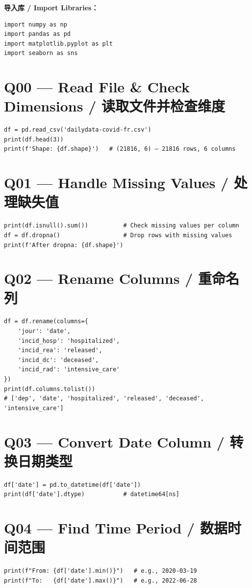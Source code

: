 \documentclass[11pt,a4paper]{report}
\begin{document}
\noindent\textbf{导入库 / Import Libraries：}
\begin{lstlisting}
import numpy as np
import pandas as pd
import matplotlib.pyplot as plt
import seaborn as sns
\end{lstlisting}

\section*{Q00 — Read File \& Check Dimensions / 读取文件并检查维度}
\begin{lstlisting}
df = pd.read_csv('dailydata-covid-fr.csv')
print(df.head(3))
print(f'Shape: {df.shape}')   # (21816, 6) — 21816 rows, 6 columns
\end{lstlisting}

\section*{Q01 — Handle Missing Values / 处理缺失值}
\begin{lstlisting}
print(df.isnull().sum())          # Check missing values per column
df = df.dropna()                  # Drop rows with missing values
print(f'After dropna: {df.shape}')
\end{lstlisting}

\section*{Q02 — Rename Columns / 重命名列}
\begin{lstlisting}
df = df.rename(columns={
    'jour': 'date',
    'incid_hosp': 'hospitalized',
    'incid_rea': 'released',
    'incid_dc': 'deceased',
    'incid_rad': 'intensive_care'
})
print(df.columns.tolist())
# ['dep', 'date', 'hospitalized', 'released', 'deceased', 'intensive_care']
\end{lstlisting}

\section*{Q03 — Convert Date Column / 转换日期类型}
\begin{lstlisting}
df['date'] = pd.to_datetime(df['date'])
print(df['date'].dtype)           # datetime64[ns]
\end{lstlisting}

\section*{Q04 — Find Time Period / 数据时间范围}
\begin{lstlisting}
print(f"From: {df['date'].min()}")   # e.g., 2020-03-19
print(f"To:   {df['date'].max()}")   # e.g., 2022-06-28
\end{lstlisting}
\end{document}
